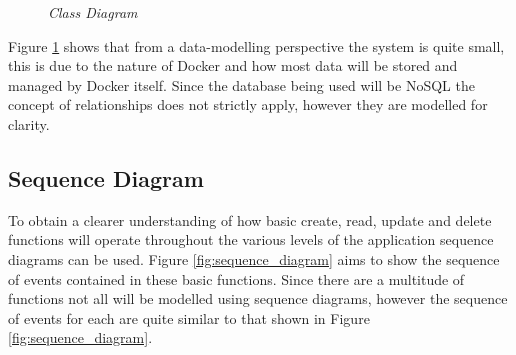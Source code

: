\begin{figure}[!ht]
\centering
{}
\caption{\em Class Diagram}
\label{fig:class_diagram}
\end{figure}

Figure \ref{fig:class_diagram} shows that from a data-modelling perspective the system is quite small, this is due to the nature of Docker and how most data will be stored and managed by Docker itself. Since the database being used will be NoSQL the concept of relationships does not strictly apply, however they are modelled for clarity.

\subsection{Sequence Diagram}

To obtain a clearer understanding of how basic create, read, update and delete functions will operate throughout the various levels of the application sequence diagrams can be used. Figure \ref{fig:sequence_diagram} aims to show the sequence of events contained in these basic functions. Since there are a multitude of functions not all will be modelled using sequence diagrams, however the sequence of events for each are quite similar to that shown in Figure \ref{fig:sequence_diagram}.

